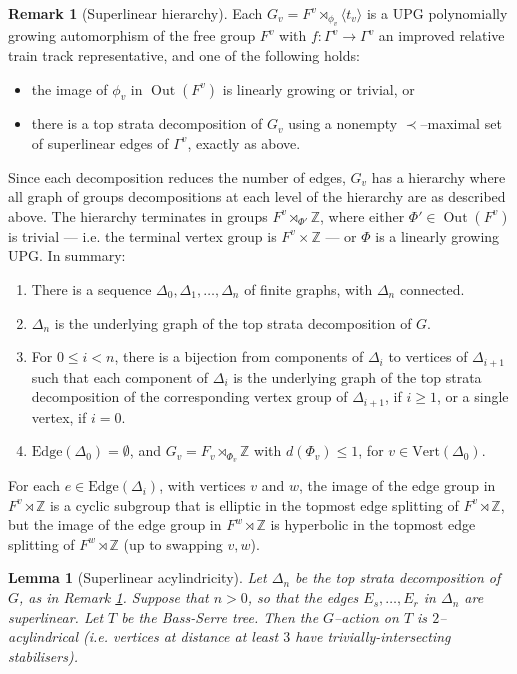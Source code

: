 \documentclass[11pt,oneside]{amsart}
\newcounter{ax}
\newtheorem{lem}[thm]{Lemma}
\theoremstyle{definition}
\newtheorem{rem}[thm]{Remark}
\DeclareMathOperator{\Out}{Out}
\newcommand{\field}[1]{\mathbb{#1}}
\newcommand{\integers}{\ensuremath{\field{Z}}}
\newcommand{\vertices}{\mathrm{Vert}}
\newcommand{\edges}{\mathrm{Edge}}
\begin{document}
\begin{rem}[Superlinear hierarchy]\label{rem:topmost-edge-vertex-groups}
Each $G_v=F^v\rtimes_{\phi_v}\langle t_v\rangle$ is a UPG polynomially growing 
automorphism of the free group $F^v$ with $f:\Gamma^v\to\Gamma^v$ an improved 
relative train track representative, and one of the following holds:
\begin{itemize}
 \item the image of $\phi_v$ in $\Out(F^v)$ is linearly growing or trivial, or
 \item there is a top strata decomposition of $G_v$ using a nonempty 
$\prec$--maximal set of superlinear edges of $\Gamma^v$, exactly as above.
\end{itemize}
Since each decomposition reduces the number of edges, $G_v$ has 
a hierarchy where all graph of groups decompositions at each level of the 
hierarchy are as described above.  The hierarchy terminates in groups 
$F^v\rtimes_{\Phi'}\integers$, where either $\Phi'\in\Out(F^v)$ is trivial --- 
i.e. the terminal vertex group is $F^v\times\integers$ --- or $\Phi$ is a 
linearly growing UPG.  In summary:
\begin{enumerate}[({Hier. }1)]
 \item There is a sequence $\Delta_0,\Delta_1,\ldots,\Delta_n$ of finite graphs, 
with $\Delta_n$ connected.
 \item $\Delta_n$ is the underlying graph of the top strata decomposition of $G$.
 
 \item For $0\leq i<n$, there is a bijection from  components of 
$\Delta_i$ to vertices of $\Delta_{i+1}$ such that each 
component of $\Delta_i$ is the underlying graph of the top strata decomposition 
of the corresponding vertex group of $\Delta_{i+1}$, if $i\geq 1$, or a single 
vertex, if $i=0$.

\item $\edges(\Delta_0)=\emptyset$, and $G_v=F_v\rtimes_{\Phi_v}\integers$ with $d(\Phi_v)\leq 1$, for $v\in\vertices(\Delta_0)$.
\end{enumerate}
For each $e\in\edges(\Delta_i)$, with vertices $v$ and $w$, the image of the edge group in $F^v\rtimes\integers$ is a cyclic subgroup that is elliptic in the topmost edge splitting of $F^v\rtimes\integers$, but the image of the edge group in $F^w\rtimes\integers$ is hyperbolic in the topmost edge splitting of $F^w\rtimes\integers$ (up to swapping $v,w$).
\end{rem}


\begin{lem}[Superlinear acylindricity]\label{lem:topmost-edges-acylindrical}
Let $\Delta_n$ be the top strata decomposition of $G$, as in Remark \ref{rem:topmost-edge-vertex-groups}.  Suppose that $n>0$, so that the edges $E_s,\ldots,E_r$ in $\Delta_n$ are superlinear.  Let $T$ be the Bass-Serre tree.  Then the $G$--action on $T$ is $2$--acylindrical (i.e. vertices at distance at least $3$ have trivially-intersecting stabilisers).
\end{lem}
\end{document}

